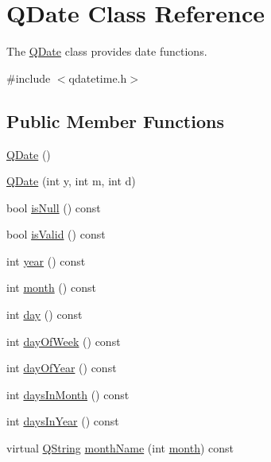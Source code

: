 \hypertarget{class_q_date}{}\section{Q\+Date Class Reference}
\label{class_q_date}


The \mbox{\hyperlink{class_q_date}{Q\+Date}} class provides date functions.  




{\ttfamily \#include $<$qdatetime.\+h$>$}

\subsection*{Public Member Functions}
\begin{DoxyCompactItemize}
\item 
\mbox{\hyperlink{class_q_date_ac553172d4c172c75bb78e9b246eaa0a1}{Q\+Date}} ()
\item 
\mbox{\hyperlink{class_q_date_abaf62f540ece3f5da8a7fa61298c34f3}{Q\+Date}} (int y, int m, int d)
\item 
bool \mbox{\hyperlink{class_q_date_a68f2787f407fd6812712b34c11f9bfb8}{is\+Null}} () const
\item 
bool \mbox{\hyperlink{class_q_date_a29baa5808185ed5a3ed5a0440e27ca9c}{is\+Valid}} () const
\item 
int \mbox{\hyperlink{class_q_date_a7ad4fc16e91f089391a4ea9710076839}{year}} () const
\item 
int \mbox{\hyperlink{class_q_date_a42aa3a5238c1dd81848e0bf690b3dce5}{month}} () const
\item 
int \mbox{\hyperlink{class_q_date_a4da6cc4ed155922c376d61102ffcb372}{day}} () const
\item 
int \mbox{\hyperlink{class_q_date_ae69fd6a7673886fc31ce220ef2137d39}{day\+Of\+Week}} () const
\item 
int \mbox{\hyperlink{class_q_date_ac62a08183c6fdd45f2a96e8f91b0f7a2}{day\+Of\+Year}} () const
\item 
int \mbox{\hyperlink{class_q_date_aa2321fc7b1bd778bd37a94e3c155e621}{days\+In\+Month}} () const
\item 
int \mbox{\hyperlink{class_q_date_ac3ae4b9dc8054be16c1524d20a8d8849}{days\+In\+Year}} () const
\item 
virtual \mbox{\hyperlink{class_q_string}{Q\+String}} \mbox{\hyperlink{class_q_date_afa5fcbf8ec6629175873dd50cbc3da4c}{month\+Name}} (int \mbox{\hyperlink{class_q_date_a42aa3a5238c1dd81848e0bf690b3dce5}{month}}) const
\item 

\end{DoxyCompactItemize}

